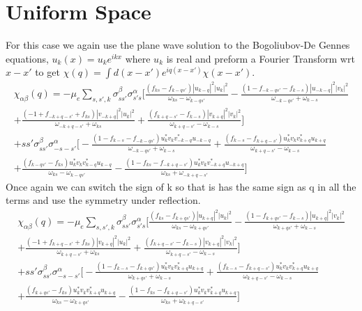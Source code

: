 \documentclass{article}
\begin{document}
\section*{Uniform Space}
For this case we again use the plane wave solution to the Bogoliubov-De Gennes equations, $u_k(x)=u_ke^{ikx}$ where $u_k$ is real and preform a Fourier Transform wrt $x-x'$ to get $\chi(q)=\int d(x-x')e^{iq(x-x')} \chi(x-x')$.
\begin{align*}
\chi_{\alpha\beta}(q)=-\mu_e\sum\limits_{s,s',k}\sigma^\beta_{ss'}\sigma^\alpha_{s's}\bigg[\frac{(f_{ks}-f_{k-q s'})|u_{k-q}|^2|u_k|^2}{\omega_{ks}-\omega_{k-q s'}} 
-\frac{(1-f_{-k-q s'}-f_{k-s})|u_{-k-q}|^2|v_k|^2}{\omega_{-k-q s'}+\omega_{k-s}} \\
+\frac{(-1+f_{-k+q -s'}+f_{ks})|v_{-k+q}|^2|u_k|^2}{\omega_{-k+q -s'}+\omega_{ks}} 
+\frac{(f_{k+q -s'}-f_{k-s})|v_{k+q}|^2|v_k|^2}{\omega_{k+q-s'}-\omega_{k-s}}\bigg] \\
+ss'\sigma^\beta_{ss'}\sigma^\alpha_{-s-s'}\bigg[-\frac{(1-f_{k-s}-f_{-k-q s'})u^*_kv_kv^*_{-k-q}u_{-k-q}}{\omega_{-k-q s'}+\omega_{k-s}} 
+\frac{(f_{k-s}-f_{k+q -s'})u^*_kv_kv^*_{k+q}u_{k+q}}{\omega_{k+q -s'}-\omega_{k-s}} \\
+\frac{(f_{k-q s'}-f_{ks})u^*_kv_kv^*_{k-q}u_{k-q}}{\omega_{ks}-\omega_{k-q s'}} 
-\frac{(1-f_{ks}-f_{-k+q -s'})u^*_kv_kv^*_{-k+q}u_{-k+q}}{\omega_{ks}+\omega_{-k+q -s'}}\bigg]
\end{align*}
Once again we can switch the sign of k so that is has the same sign as q in all the terms and use the symmetry under reflection.
\begin{align*}
\chi_{\alpha\beta}(q)=-\mu_e\sum\limits_{s,s',k}\sigma^\beta_{ss'}\sigma^\alpha_{s's}\bigg[\frac{(f_{ks}-f_{k+q s'})|u_{k+q}|^2|u_k|^2}{\omega_{ks}-\omega_{k+q s'}}
-\frac{(1-f_{k+q s'}-f_{k-s})|u_{k+q}|^2|v_k|^2}{\omega_{k+q s'}+\omega_{k-s}} \\
+\frac{(-1+f_{k+q -s'}+f_{ks})|v_{k+q}|^2|u_k|^2}{\omega_{k+q-s'}+\omega_{ks}}
+\frac{(f_{k+q -s'}-f_{k-s})|v_{k+q}|^2|v_k|^2}{\omega_{k+q-s'}-\omega_{k-s}}\bigg] \\
+ss'\sigma^\beta_{ss'}\sigma^\alpha_{-s-s'}\bigg[-\frac{(1-f_{k-s}-f_{k+q s'})u^*_kv_kv^*_{k+q}u_{k+q}}{\omega_{k+q s'}+\omega_{k-s}} 
+\frac{(f_{k-s}-f_{k+q -s'})u^*_kv_kv^*_{k+q}u_{k+q}}{\omega_{k+q -s'}-\omega_{k-s}} \\
+\frac{(f_{k+q s'}-f_{ks})u^*_kv_kv^*_{k+q}u_{k+q}}{\omega_{ks}-\omega_{k+q s'}} 
-\frac{(1-f_{ks}-f_{k+q -s'})u^*_kv_kv^*_{k+q}u_{k+q}}{\omega_{ks}+\omega_{k+q -s'}}\bigg]
\end{align*}
\end{document}
